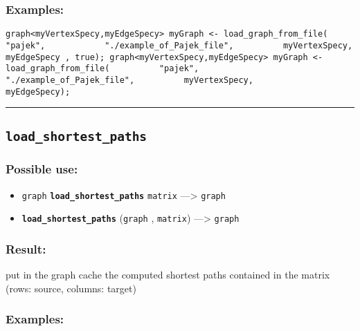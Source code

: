 \documentclass[]{book}
\providecommand{\tightlist}{%
  \setlength{\itemsep}{0pt}\setlength{\parskip}{0pt}}
\theoremstyle{definition}
\theoremstyle{definition}
\theoremstyle{definition}
\theoremstyle{remark}
\begin{document}
\subsubsection{Examples:}\label{examples-226}

\begin{verbatim}
graph<myVertexSpecy,myEdgeSpecy> myGraph <- load_graph_from_file(           "pajek",            "./example_of_Pajek_file",          myVertexSpecy,          myEdgeSpecy , true); graph<myVertexSpecy,myEdgeSpecy> myGraph <- load_graph_from_file(          "pajek",            "./example_of_Pajek_file",          myVertexSpecy,          myEdgeSpecy); 
\end{verbatim}

\begin{center}\rule{0.5\linewidth}{\linethickness}\end{center}

\subsection{\texorpdfstring{\texttt{load\_shortest\_paths}}{load\_shortest\_paths}}\label{load_shortest_paths}

\subsubsection{Possible use:}\label{possible-use-327}

\begin{itemize}
\tightlist
\item
  \texttt{graph} \textbf{\texttt{load\_shortest\_paths}} \texttt{matrix}
  ---\textgreater{} \texttt{graph}
\item
  \textbf{\texttt{load\_shortest\_paths}} (\texttt{graph} ,
  \texttt{matrix}) ---\textgreater{} \texttt{graph}
\end{itemize}

\subsubsection{Result:}\label{result-317}

put in the graph cache the computed shortest paths contained in the
matrix (rows: source, columns: target)

\subsubsection{Examples:}\label{examples-227}
\end{document}
